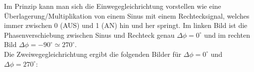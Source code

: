 \documentclass{scrartcl}						%
\begin{document}
			Im Prinzip kann man sich die Einwegegleichrichtung vorstellen wie eine Überlagerung/Multiplikation von einem Sinus mit einem Rechtecksignal, welches immer zwischen 0 (AUS) und 1 (AN) hin und her springt. Im linken Bild ist die Phasenverschiebung zwischen Sinus und Rechteck genau $ \Delta \phi = 0^\circ $ und im rechten Bild $ \Delta \phi =-90^\circ \simeq 270^\circ$.\\
			Die Zweiwegegleichrichtung ergibt die folgenden Bilder für $ \Delta \phi = 0^\circ $ und $ \Delta \phi = 270^\circ $:
			
			\begin{figure}[h!]
				\centering
			\end{figure}
			
\end{document}
